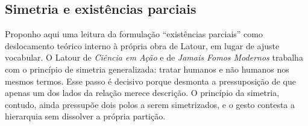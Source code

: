 \subsection{Simetria e existências parciais}

Proponho aqui uma leitura da formulação \enquote{existências parciais} como deslocamento teórico interno à própria obra de Latour, em lugar de ajuste vocabular. O Latour de \textit{Ciência em Ação} \parencite*{Latour2011CienciaEmAcao} e de \textit{Jamais Fomos Modernos} \parencite*{Latour1994Jamais} trabalha com o princípio de simetria generalizada: tratar humanos e não humanos nos mesmos termos.
Esse passo é decisivo porque desmonta a pressuposição de que apenas um dos lados da relação merece descrição. O princípio da simetria, contudo, ainda pressupõe dois polos a serem simetrizados, e o gesto contesta a hierarquia sem dissolver a própria partição.

